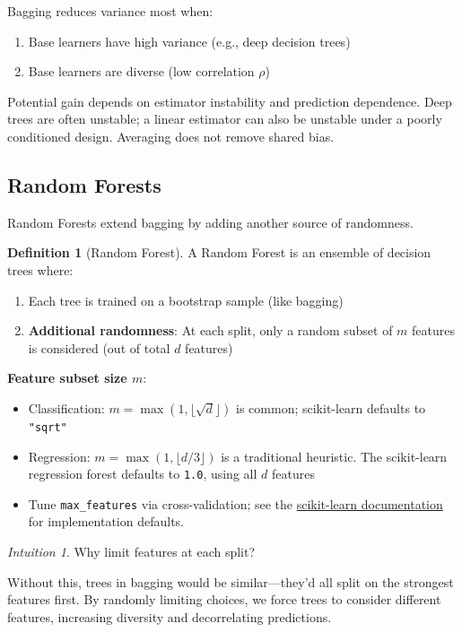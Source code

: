 \documentclass[11pt,twoside]{article}
\numberwithin{equation}{section}
\theoremstyle{plain}
\theoremstyle{definition}
\newtheorem{definition}[theorem]{Definition}
\theoremstyle{remark}
\newtheorem{intuition}[theorem]{Intuition}
\newenvironment{keyidea}{
  \begin{tcolorbox}[colback=yellow!5!white,
                    colframe=yellow!50!black,
                    title=Key Idea,
                    breakable,
                    enhanced,
                    sharp corners,
                    boxrule=0.8pt,
                    left=6pt, right=6pt, top=6pt, bottom=6pt]
}{
  \end{tcolorbox}
}
\begin{document}
\begin{keyidea}
Bagging reduces variance most when:
\begin{enumerate}
\item Base learners have high variance (e.g., deep decision trees)
\item Base learners are diverse (low correlation $\rho$)
\end{enumerate}

Potential gain depends on estimator instability and prediction dependence. Deep trees are often unstable; a linear estimator can also be unstable under a poorly conditioned design. Averaging does not remove shared bias.
\end{keyidea}

\subsection{Random Forests}

Random Forests extend bagging by adding another source of randomness.

\begin{definition}[Random Forest]
A Random Forest is an ensemble of decision trees where:
\begin{enumerate}
\item Each tree is trained on a bootstrap sample (like bagging)
\item \textbf{Additional randomness}: At each split, only a random subset of $m$ features is considered (out of total $d$ features)
\end{enumerate}
\end{definition}

\textbf{Feature subset size $m$}:
\begin{itemize}
\item Classification: $m=\max(1,\lfloor\sqrt d\rfloor)$ is common; scikit-learn defaults to \texttt{"sqrt"}
\item Regression: $m=\max(1,\lfloor d/3\rfloor)$ is a traditional heuristic. The scikit-learn regression forest defaults to \texttt{1.0}, using all $d$ features
\item Tune \texttt{max\_features} via cross-validation; see the \href{https://scikit-learn.org/stable/modules/generated/sklearn.ensemble.RandomForestRegressor.html}{scikit-learn documentation} for implementation defaults.
\end{itemize}

\begin{intuition}
Why limit features at each split?

Without this, trees in bagging would be similar---they'd all split on the strongest features first. By randomly limiting choices, we force trees to consider different features, increasing diversity and decorrelating predictions.
\end{intuition}
\end{document}
